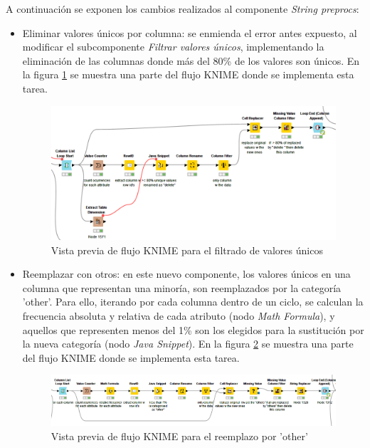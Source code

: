 A continuación se exponen los cambios realizados al componente \textit{String preprocs}:
\begin{itemize}

	\item Eliminar valores únicos por columna: se enmienda el error antes expuesto, al modificar el subcomponente \textit{Filtrar valores únicos}, implementando la eliminación de las columnas donde más del 80\% de los valores son únicos. En la figura \ref{fig:filtrar-valores-unicos-flujo} se muestra una parte del flujo KNIME donde se implementa esta tarea. 

	\begin{figure}[H]
		\centering
		\includegraphics[width=0.9\linewidth]{"figuras/capi 2/preprocesado/filtrar-valores-unicos-flujo"}
		\caption{Vista previa de flujo KNIME para el filtrado de valores únicos}
		\label{fig:filtrar-valores-unicos-flujo}
	\end{figure}

	\item Reemplazar con otros: en este nuevo componente, los valores únicos en una columna que representan una minoría, son reemplazados por la categoría 'other'.  Para ello, iterando por cada columna dentro de un ciclo, se calculan la frecuencia absoluta y relativa de cada atributo (nodo \textit{Math Formula}), y aquellos que representen menos del 1\% son los elegidos para la sustitución por la nueva categoría (nodo \textit{Java Snippet}). En la figura \ref{fig:flujo-reemplazar-others} se muestra una parte del flujo KNIME donde se implementa esta tarea. 

	\begin{figure}[H]
		\centering
		\includegraphics[width=1\linewidth]{"figuras/capi 2/preprocesado/flujo-reemplazar-others"}
		\caption{Vista previa de flujo KNIME para el reemplazo por 'other'}
		\label{fig:flujo-reemplazar-others}
	\end{figure}

	
\end{itemize}


